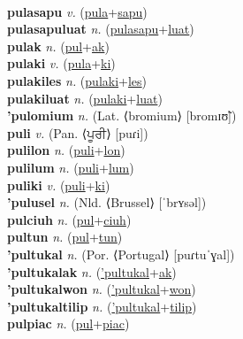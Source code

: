  \label{pulanelon} \\
\textbf{pulasapu} \textit{v.} (\hyperref[pula]{pula}+\hyperref[sapu]{sapu})
 \label{pulasapu} \\
\textbf{pulasapuluat} \textit{n.} (\hyperref[pulasapu]{pulasapu}+\hyperref[luat]{luat})
 \label{pulasapuluat} \\
\textbf{pulak} \textit{n.} (\hyperref[pul]{pul}+\hyperref[ak]{ak})
 \label{pulak} \\
\textbf{pulaki} \textit{v.} (\hyperref[pula]{pula}+\hyperref[ki]{ki})
 \label{pulaki} \\
\textbf{pulakiles} \textit{n.} (\hyperref[pulaki]{pulaki}+\hyperref[les]{les})
 \label{pulakiles} \\
\textbf{pulakiluat} \textit{n.} (\hyperref[pulaki]{pulaki}+\hyperref[luat]{luat})
 \label{pulakiluat} \\
\textbf{'pulomium} \textit{n.} (Lat. ⟨bromium⟩ [bromɪʊ̃])
 \label{'pulomium} \\
\textbf{puli} \textit{v.} (Pan. ⟨ਪੂਰੀ⟩ [puɾi])
 \label{puli} \\
\textbf{pulilon} \textit{n.} (\hyperref[puli]{puli}+\hyperref[lon]{lon})
 \label{pulilon} \\
\textbf{pulilum} \textit{n.} (\hyperref[puli]{puli}+\hyperref[lum]{lum})
 \label{pulilum} \\
\textbf{puliki} \textit{v.} (\hyperref[puli]{puli}+\hyperref[ki]{ki})
 \label{puliki} \\
\textbf{'pulusel} \textit{n.} (Nld. ⟨Brussel⟩ [ˈbrʏsəl])
 \label{'pulusel} \\
\textbf{pulciuh} \textit{n.} (\hyperref[pul]{pul}+\hyperref[ciuh]{ciuh})
 \label{pulciuh} \\
\textbf{pultun} \textit{n.} (\hyperref[pul]{pul}+\hyperref[tun]{tun})
 \label{pultun} \\
\textbf{'pultukal} \textit{n.} (Por. ⟨Portugal⟩ [puɾtuˈɣal])
 \label{'pultukal} \\
\textbf{'pultukalak} \textit{n.} (\hyperref['pultukal]{'pultukal}+\hyperref[ak]{ak})
 \label{'pultukalak} \\
\textbf{'pultukalwon} \textit{n.} (\hyperref['pultukal]{'pultukal}+\hyperref[won]{won})
 \label{'pultukalwon} \\
\textbf{'pultukaltilip} \textit{n.} (\hyperref['pultukal]{'pultukal}+\hyperref[tilip]{tilip})
 \label{'pultukaltilip} \\
\textbf{pulpiac} \textit{n.} (\hyperref[pul]{pul}+\hyperref[piac]{piac})
 \label{pulpiac} \\
